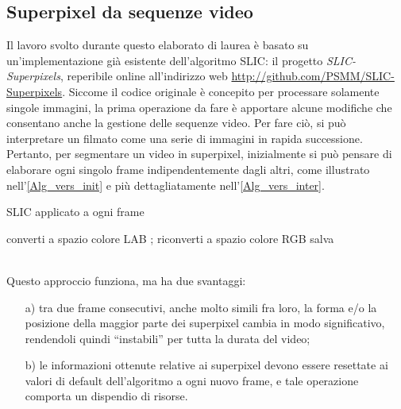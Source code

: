 \documentclass[12pt,a4paper,oneside]{article}
\begin{document}
\subsection{Superpixel da sequenze video}
Il lavoro svolto durante questo elaborato di laurea è basato su un'implementazione già esistente dell'algoritmo \gls{SLIC}: il progetto \textit{SLIC-Superpixels}, reperibile online all'indirizzo web \url{http://github.com/PSMM/SLIC-Superpixels}. Siccome il codice originale è concepito per processare solamente singole immagini, la prima operazione da fare è apportare alcune modifiche che consentano anche la gestione delle sequenze video. Per fare ciò, si può interpretare un filmato come una serie di immagini in rapida successione. Pertanto, per segmentare un video in superpixel, inizialmente si può pensare di elaborare ogni singolo frame indipendentemente dagli altri, come illustrato nell'\cref{Alg_vers_init} e più dettagliatamente nell'\cref{Alg_vers_inter}.
\begin{algorithm}[!htb]
	\caption{SLIC applicato a ogni frame}
	\label{Alg_vers_init}
	\BlankLine
	\BlankLine
	{
	converti \frame a spazio colore \mbox{LAB}\;
	\BlankLine
	\eseguiSLICsuImmagine{\frame};
	\BlankLine
	riconverti \frame a spazio colore \mbox{RGB}\;
	salva \frame\;
	}
\end{algorithm}
\\\noindent Questo approccio funziona, ma ha due svantaggi:
\begin{enumerate}
	\item[a)]tra due frame consecutivi, anche molto simili fra loro, la forma e/o la posizione della maggior parte dei superpixel cambia in modo significativo, rendendoli quindi ``instabili'' per tutta la durata del video;
	\item[b)]le informazioni ottenute relative ai superpixel devono essere resettate ai valori di default dell'algoritmo a ogni nuovo frame, e tale operazione comporta un dispendio di risorse.
\end{enumerate}
\end{document}
